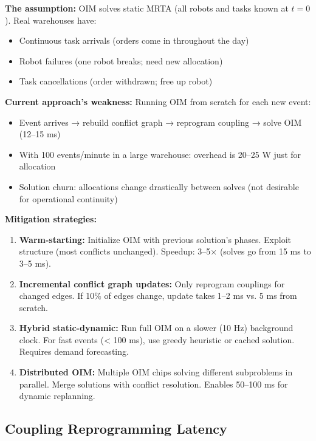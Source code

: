 \textbf{The assumption:} OIM solves static MRTA (all robots and tasks known at $t=0$). Real warehouses have:
\begin{itemize}
\item Continuous task arrivals (orders come in throughout the day)
\item Robot failures (one robot breaks; need new allocation)
\item Task cancellations (order withdrawn; free up robot)
\end{itemize}

\textbf{Current approach's weakness:} Running OIM from scratch for each new event:
\begin{itemize}
\item Event arrives → rebuild conflict graph → reprogram coupling → solve OIM (12--15 ms)
\item With 100 events/minute in a large warehouse: overhead is 20--25 W just for allocation
\item Solution churn: allocations change drastically between solves (not desirable for operational continuity)
\end{itemize}

\textbf{Mitigation strategies:}
\begin{enumerate}
\item \textbf{Warm-starting:} Initialize OIM with previous solution's phases. Exploit structure (most conflicts unchanged). Speedup: 3--5× (solves go from 15 ms to 3--5 ms).

\item \textbf{Incremental conflict graph updates:} Only reprogram couplings for changed edges. If 10\% of edges change, update takes 1--2 ms vs. 5 ms from scratch.

\item \textbf{Hybrid static-dynamic:} Run full OIM on a slower (10 Hz) background clock. For fast events (< 100 ms), use greedy heuristic or cached solution. Requires demand forecasting.

\item \textbf{Distributed OIM:} Multiple OIM chips solving different subproblems in parallel. Merge solutions with conflict resolution. Enables 50--100 ms for dynamic replanning.
\end{enumerate}

\subsection{Coupling Reprogramming Latency}

